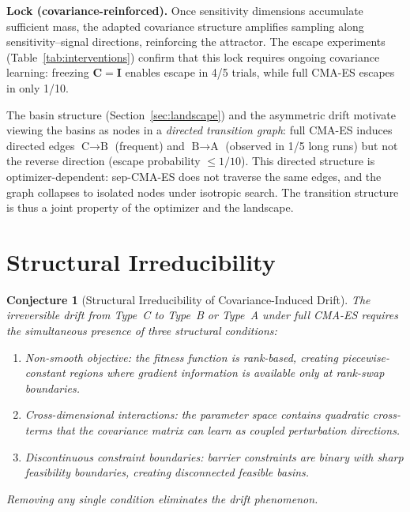 \documentclass[twoside]{article}
\newcommand{\bC}{\mathbf{C}}
\newcommand{\bI}{\mathbf{I}}
\newtheorem{conjecture}{Conjecture}
\begin{document}
\textbf{Lock (covariance-reinforced).} Once sensitivity dimensions accumulate
sufficient mass, the adapted covariance structure amplifies sampling along
sensitivity--signal directions, reinforcing the attractor. The escape
experiments (Table~\ref{tab:interventions}) confirm that this lock requires
ongoing covariance learning: freezing $\bC = \bI$ enables escape in 4/5
trials, while full CMA-ES escapes in only 1/10.

The basin structure (Section~\ref{sec:landscape}) and the
asymmetric drift motivate viewing the basins as nodes in a \emph{directed
transition graph}: full CMA-ES induces directed edges $\text{C} \to \text{B}$ (frequent)
and $\text{B} \to \text{A}$ (observed in 1/5 long runs) but not the
reverse direction (escape probability $\leq 1/10$). This directed structure is
optimizer-dependent: sep-CMA-ES does not traverse the same edges, and
the graph collapses to isolated nodes under isotropic search. The
transition structure is thus a joint property of the optimizer and
the landscape.

\section{Structural Irreducibility}
\label{sec:irreducibility}

\begin{conjecture}[Structural Irreducibility of Covariance-Induced Drift]
\label{conj:irreducibility}
The irreversible drift from Type~C to Type~B or Type~A under full CMA-ES
requires the simultaneous presence of three structural conditions:
\begin{enumerate}
\item[\emph{(C1)}] \emph{Non-smooth objective}: the fitness function is
  rank-based, creating piecewise-constant regions where gradient information
  is available only at rank-swap boundaries.
\item[\emph{(C2)}] \emph{Cross-dimensional interactions}: the parameter space
  contains quadratic cross-terms that the covariance matrix can learn as
  coupled perturbation directions.
\item[\emph{(C3)}] \emph{Discontinuous constraint boundaries}: barrier
  constraints are binary with sharp feasibility boundaries, creating
  disconnected feasible basins.
\end{enumerate}
Removing any single condition eliminates the drift phenomenon.
\end{conjecture}
\end{document}

